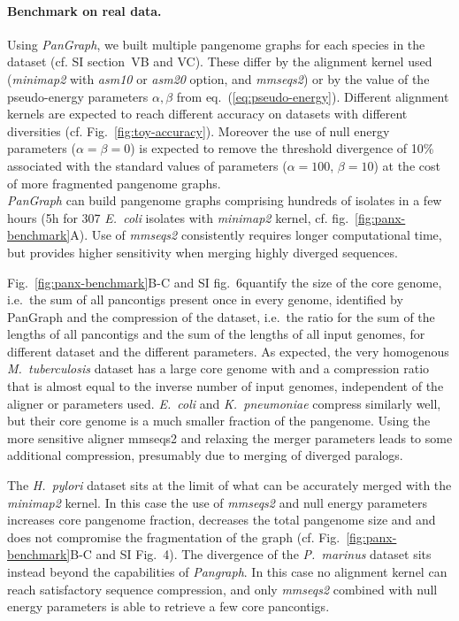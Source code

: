 \documentclass[aps,rmp,preprint,superscriptaddress,10pt,linenumbers]{revtex4-1}
\newcommand{\SIdataBenchmark}{V}
\newcommand{\SIfigBenchmark}{6}
\begin{document}
\paragraph*{Benchmark on real data.}
Using \textit{PanGraph}, we built multiple pangenome graphs for each species in the dataset (cf. SI section~{\SIdataBenchmark}B and {\SIdataBenchmark}C). These differ by the alignment kernel used (\textit{minimap2} with \textit{asm10} or \textit{asm20} option, and \textit{mmseqs2}) or by the value of the pseudo-energy parameters $\alpha,\beta$ from eq.~(\ref{eq:pseudo-energy}).
Different alignment kernels are expected to reach different accuracy on datasets with different diversities (cf. Fig.~\ref{fig:toy-accuracy}). Moreover the use of null energy parameters ($\alpha = \beta = 0$) is expected to remove the threshold divergence of 10\% associated with the standard values of parameters ($\alpha=100$, $\beta=10$) at the cost of more fragmented pangenome graphs.\\
\textit{PanGraph} can build pangenome graphs comprising hundreds of isolates in a few hours (5h for 307 \textit{E.~coli} isolates with \textit{minimap2} kernel, cf. fig.~\ref{fig:panx-benchmark}A).
Use of \textit{mmseqs2} consistently requires longer computational time, but provides higher sensitivity when merging highly diverged sequences.

Fig.~\ref{fig:panx-benchmark}B-C and SI fig.~\SIfigBenchmark quantify the size of the core genome, i.e.~the sum of all pancontigs present once in every genome, identified by PanGraph and the compression of the dataset, i.e.~the ratio for the sum of the lengths of all pancontigs and the sum of the lengths of all input genomes, for different dataset and the different parameters.
As expected, the very homogenous \textit{M.~tuberculosis} dataset has a large core genome with and a compression ratio that is almost equal to the inverse number of input genomes, independent of the aligner or parameters used.
\textit{E.~coli} and \textit{K.~pneumoniae} compress similarly well, but their core genome is a much smaller fraction of the pangenome.
Using the more sensitive aligner mmseqs2 and relaxing the merger parameters leads to some additional compression, presumably due to merging of diverged paralogs.

The \textit{H.~pylori}  dataset sits at the limit of what can be accurately merged with the \textit{minimap2} kernel.
In this case the use of \textit{mmseqs2} and null energy parameters increases core pangenome fraction, decreases the total pangenome size and and does not compromise the fragmentation of the graph (cf. Fig.~\ref{fig:panx-benchmark}B-C and SI Fig.~4).
The divergence of the \textit{P.~marinus} dataset sits instead beyond the capabilities of \textit{Pangraph}. In this case no alignment kernel can reach satisfactory sequence compression, and only \textit{mmseqs2} combined with null energy parameters is able to retrieve a few core pancontigs.\\
\end{document}
